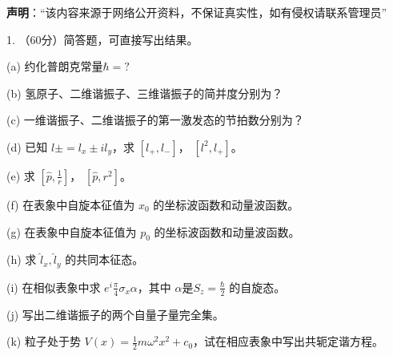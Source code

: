 
\textbf{声明}：“该内容来源于网络公开资料，不保证真实性，如有侵权请联系管理员”

1. （60分）简答题，可直接写出结果。

(a) 约化普朗克常量$\hbar = ?$

(b) 氢原子、二维谐振子、三维谐振子的简并度分别为？

(c) 一维谐振子、二维谐振子的第一激发态的节拍数分别为？

(d) 已知 $l\pm = l_x \pm il_y $，求 $[l_+, l_-]$， $[l^2, l_+]$。

(e) 求 $[\hat p, \frac{1}{r}]$， $[\hat p, r^2]$。

(f) 在表象中自旋本征值为 $x_0$ 的坐标波函数和动量波函数。

(g) 在表象中自旋本征值为 $p_0$ 的坐标波函数和动量波函数。

(h) 求 $\hat l_x,\hat l_y$ 的共同本征态。

(i) 在相似表象中求 $e^i\frac{\pi}{4}\sigma_x\alpha$，其中 $\alpha$是$S_z =\frac{\hbar}{2} $ 的自旋态。

(j) 写出二维谐振子的两个自量子量完全集。

(k) 粒子处于势 $V(x) = \frac{1}{2}m\omega^2x^2 + c_0$，试在相应表象中写出共轭定谐方程。
